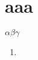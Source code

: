 \documentclass{ctexart}
\begin{document}
\section{aaa}
\(\alpha \beta \gamma\)
\begin{enumerate}
	\item
\end{enumerate}
\end{document}

